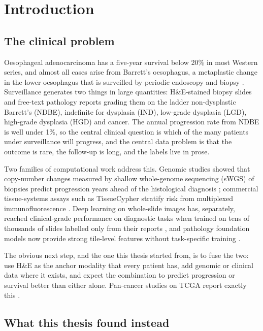 \chapter{Introduction}
\label{ch:intro}

\section{The clinical problem}

Oesophageal adenocarcinoma has a five-year survival below 20\% in most Western series, and almost all cases arise from Barrett's oesophagus, a metaplastic change in the lower oesophagus that is surveilled by periodic endoscopy and biopsy \citep{fitzgerald2014bsg}. Surveillance generates two things in large quantities: H\&E-stained biopsy slides and free-text pathology reports grading them on the ladder non-dysplastic Barrett's (NDBE), indefinite for dysplasia (IND), low-grade dysplasia (LGD), high-grade dysplasia (HGD) and cancer. The annual progression rate from NDBE is well under 1\%, so the central clinical question is which of the many patients under surveillance will progress, and the central data problem is that the outcome is rare, the follow-up is long, and the labels live in prose.

Two families of computational work address this. Genomic studies showed that copy-number changes measured by shallow whole-genome sequencing (sWGS) of biopsies predict progression years ahead of the histological diagnosis \citep{killcoyne2020}; commercial tissue-systems assays such as TissueCypher stratify risk from multiplexed immunofluorescence \citep{critchleythorne2016}. Deep learning on whole-slide images has, separately, reached clinical-grade performance on diagnostic tasks when trained on tens of thousands of slides labelled only from their reports \citep{campanella2019}, and pathology foundation models now provide strong tile-level features without task-specific training \citep{chen2024uni, xu2024gigapath, vorontsov2024virchow}.

The obvious next step, and the one this thesis started from, is to fuse the two: use H\&E as the anchor modality that every patient has, add genomic or clinical data where it exists, and expect the combination to predict progression or survival better than either alone. Pan-cancer studies on TCGA report exactly this \citep{chen2022porpoise}.

\section{What this thesis found instead}

